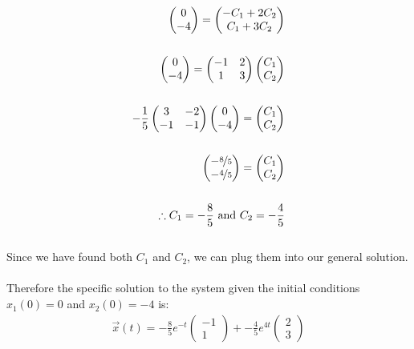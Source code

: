 \documentclass{jhwhw}
\begin{document}
\begin{align*}
    \begin{pmatrix} 0 \\ -4 \end{pmatrix} = \begin{pmatrix} -C_1 + 2C_2 \\ C_1 + 3C_2 \end{pmatrix} \\ \\
    \begin{pmatrix} 0 \\ -4 \end{pmatrix} = \begin{pmatrix} -1 & 2 \\ 1 & 3 \end{pmatrix} \begin{pmatrix} C_1 \\ C_2 \end{pmatrix} \\ \\
    -\frac{1}{5}\begin{pmatrix} 3 & -2 \\ -1 & -1 \end{pmatrix} \begin{pmatrix} 0 \\ -4 \end{pmatrix} = \begin{pmatrix} C_1 \\ C_2 \end{pmatrix} \\ \\ 
    \begin{pmatrix} -\nicefrac{8}{5} \\ -\nicefrac{4}{5} \end{pmatrix} = \begin{pmatrix} C_1 \\ C_2 \end{pmatrix} \\ \\
    \therefore C_1 = -\frac{8}{5} \text{ and } C_2 = -\frac{4}{5}
\end{align*}
\\
Since we have found both \(C_1\) and \(C_2\), we can plug them into our general solution.
\\ \\ 
Therefore the specific solution to the system given the initial conditions \(x_1(0) = 0\) and \(x_2(0) = -4\) is:
\\
\begin{align*}
    \boxed{\vec x(t) = -\frac{8}{5} e^{-t} \begin{pmatrix} -1 \\ 1 \end{pmatrix} + -\frac{4}{5} e^{4t} \begin{pmatrix} 2 \\ 3 \end{pmatrix}}
\end{align*}
\\
\end{document}
